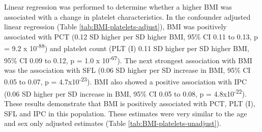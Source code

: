 \documentclass[11pt,twoside]{bristolthesis}
\begin{document}
Linear regression was performed to determine whether a higher BMI was associated with a change in platelet characteristics. In the confounder adjusted linear regression (Table \ref{tab:BMI-platelets-adjust}), BMI was positively associated with PCT (0.12 SD higher per SD higher BMI, 95\% CI 0.11 to 0.13, p = 9.2 x 10\textsuperscript{-88}) and platelet count (PLT (I) 0.11 SD higher per SD higher BMI, 95\% CI 0.09 to 0.12, p = 1.0 x 10\textsuperscript{-67}). The next strongest association with BMI was the association with SFL (0.06 SD higher per SD increase in BMI, 95\% CI 0.05 to 0.07, p = 4.7x10\textsuperscript{-23}). BMI also showed a positive association with IPC (0.06 SD higher per SD increase in BMI, 95\% CI 0.05 to 0.08, p = 4.8x10\textsuperscript{-22}). These results demonstrate that BMI is positively associated with PCT, PLT (I), SFL and IPC in this population. These estimates were very similar to the age and sex only adjusted estimates (Table \ref{tab:BMI-platelets-unadjust}).
\end{document}
